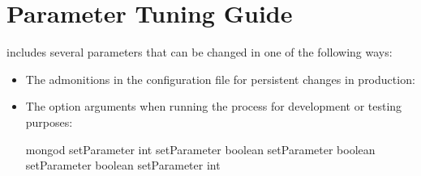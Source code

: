 \documentclass[letterpaper,10pt,english]{sphinxmanual}
\begin{document}
\chapter{ Parameter Tuning Guide}
\label{\detokenize{set-parameter:psmdb-parameter-tuning-guide}}\label{\detokenize{set-parameter:setparameter}}\label{\detokenize{set-parameter::doc}}
\sphinxAtStartPar
{} includes several parameters that can be changed
in one of the following ways:
\begin{itemize}
\item {} 
\sphinxAtStartPar
The  admonitions in the configuration file
for persistent changes in production:

\begin{sphinxVerbatim}[commandchars=\\\{\}]
   
   
   
   
   
\end{sphinxVerbatim}

\item {} 
\sphinxAtStartPar
The  option arguments when running the  process
for development or testing purposes:

\begin{sphinxVerbatim}[commandchars=\\\{\}]
\PYGZdl{} mongod 
  \PYGZhy{}\PYGZhy{}setParameter \PYGZlt{}int\PYGZgt{} 
  \PYGZhy{}\PYGZhy{}setParameter \PYGZlt{}boolean\PYGZgt{} 
  \PYGZhy{}\PYGZhy{}setParameter \PYGZlt{}boolean\PYGZgt{} 
  \PYGZhy{}\PYGZhy{}setParameter \PYGZlt{}boolean\PYGZgt{} 
  \PYGZhy{}\PYGZhy{}setParameter \PYGZlt{}int\PYGZgt{}
\end{sphinxVerbatim}


\end{itemize}
\end{document}

